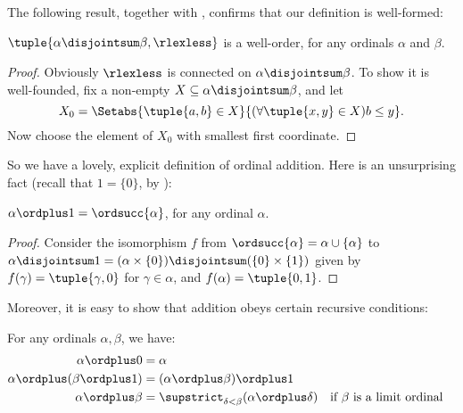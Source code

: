\documentclass[../../../include/open-logic-section]{subfiles}
\begin{document}
The following result, together with
, confirms that our
definition is well-formed:

\begin{lem} 
$\tuple{\alpha \disjointsum \beta, \rlexless}$ is a well-order, for
any ordinals $\alpha$ and $\beta$.
\end{lem}

\begin{proof}
Obviously $\rlexless$ is connected on $\alpha \disjointsum \beta$. To
show it is well-founded, fix a non-empty $X \subseteq \alpha
\disjointsum \beta$, and let 
\[
	X_0 = \Setabs{\tuple{a, b} \in X}{(\forall \tuple{x, y} \in X)b \leq y}.
\]
Now choose the element of $X_0$ with smallest first coordinate. 
\end{proof}

So we have a lovely, explicit definition of ordinal addition. Here is
an unsurprising fact (recall that  $1 = \{0\}$, by
):
\begin{prop}
$\alpha \ordplus  1 = \ordsucc{\alpha}$, for any ordinal $\alpha$.
\end{prop}

\begin{proof}
Consider the isomorphism $f$ from $\ordsucc{\alpha} = \alpha \cup
\{\alpha\}$ to $\alpha\disjointsum1 = (\alpha \times \{0\})
\disjointsum (\{0\} \times \{1\})$ given by $f(\gamma) =
\tuple{\gamma, 0}$ for $\gamma \in \alpha$, and $f(\alpha) = \tuple{0,
1}$.
\end{proof}

Moreover, it is easy to show that addition obeys certain recursive
conditions:

\begin{lem}
For any ordinals $\alpha, \beta$, we have:
\begin{align*}
	\alpha\ordplus 0 &= \alpha\\
	\alpha \ordplus  (\beta\ordplus 1) &= (\alpha \ordplus  \beta) \ordplus  1\\
	\alpha  \ordplus  \beta &= \supstrict_{\delta < \beta}(\alpha \ordplus  \delta) && \text{if $\beta $ is a limit ordinal}
\end{align*}
\end{lem}
\end{document}
